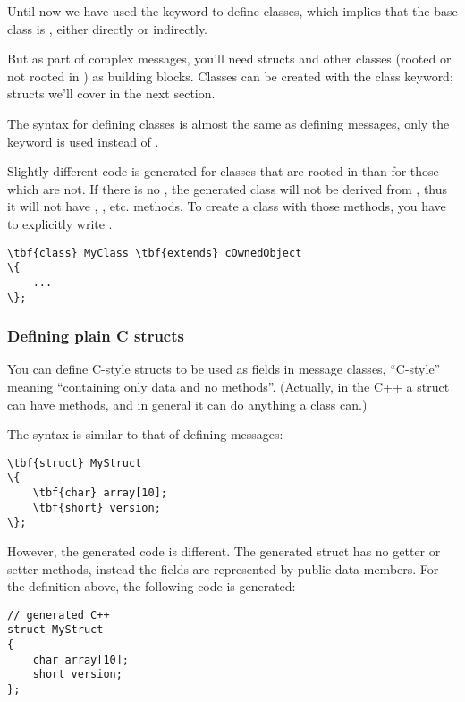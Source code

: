 Until now we have used the  keyword to define classes, which
implies that the base class is , either directly or indirectly.

But as part of complex messages, you'll need structs and other classes
(rooted or not rooted in ) as building blocks.
Classes can be created with the  class keyword;
structs we'll cover in the next section.

The syntax for defining classes is almost the same as defining messages,
only the  keyword is used instead of .

Slightly different code is generated for classes that are rooted in
 than for those which are not.
If there is no , the generated class will not be
derived from , thus it will not have ,
, etc. methods.
To create a class with those methods, you have to explicitly write
.

\begin{Verbatim}[commandchars=\\\{\}]
\tbf{class} MyClass \tbf{extends} cOwnedObject
\{
    ...
\};
\end{Verbatim}



\subsubsection{Defining plain C structs}

You can define C-style structs to be used as fields in message classes,
``C-style'' meaning ``containing only data and no methods''.
(Actually, in the C++ a struct can have methods,
and in general it can do anything a class can.)

The syntax is similar to that of defining messages:

\begin{Verbatim}[commandchars=\\\{\}]
\tbf{struct} MyStruct
\{
    \tbf{char} array[10];
    \tbf{short} version;
\};
\end{Verbatim}

However, the generated code is different. The generated struct has
no getter or setter methods, instead the fields are represented
by public data members. For the definition above, the
following code is generated:

\begin{verbatim}
// generated C++
struct MyStruct
{
    char array[10];
    short version;
};
\end{verbatim}


